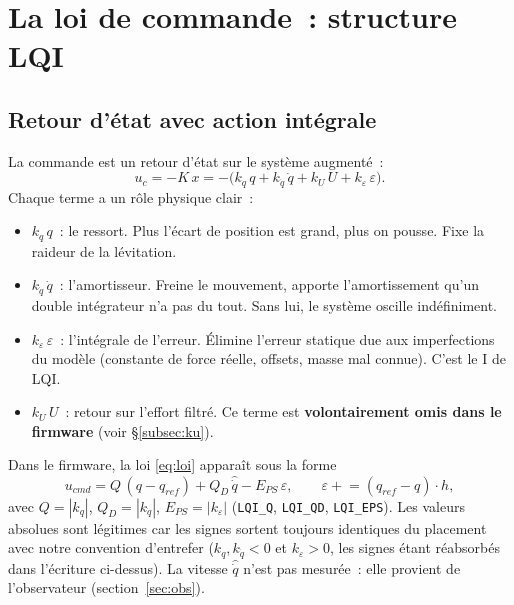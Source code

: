 \documentclass[a4paper,11pt]{article}
\newcommand{\qm}{q}
\begin{document}
\section{La loi de commande~: structure LQI}
\label{sec:lqi}

\subsection{Retour d'état avec action intégrale}

La commande est un retour d'état sur le système augmenté~:
\begin{equation}
    u_c = -K\,x = -\big(k_q\,\qm + k_{\dot q}\,\dot{\qm} + k_U\,U
          + k_\varepsilon\,\varepsilon\big).
    \label{eq:loi}
\end{equation}
Chaque terme a un rôle physique clair~:
\begin{itemize}
    \item $k_q\,\qm$~: le ressort. Plus l'écart de position est grand, plus on
          pousse. Fixe la raideur de la lévitation.
    \item $k_{\dot q}\,\dot{\qm}$~: l'amortisseur. Freine le mouvement, apporte
          l'amortissement qu'un double intégrateur n'a pas du tout. Sans lui,
          le système oscille indéfiniment.
    \item $k_\varepsilon\,\varepsilon$~: l'intégrale de l'erreur. Élimine
          l'erreur statique due aux imperfections du modèle (constante de
          force réelle, offsets, masse mal connue). C'est le \og I \fg{} de LQI.
    \item $k_U\,U$~: retour sur l'effort filtré. Ce terme est
          \textbf{volontairement omis dans le firmware} (voir
          §\ref{subsec:ku}).
\end{itemize}

Dans le firmware, la loi \eqref{eq:loi} apparaît sous la forme
\begin{equation}
    u_{cmd} = Q\,(\qm - \qm_{ref}) + Q_D\,\hat{\dot q} - E_{PS}\,\varepsilon,
    \qquad \varepsilon \mathrel{+}= (\qm_{ref} - \qm)\cdot h,
\end{equation}
avec $Q = |k_q|$, $Q_D = |k_{\dot q}|$, $E_{PS} = |k_\varepsilon|$
(\texttt{LQI\_Q}, \texttt{LQI\_QD}, \texttt{LQI\_EPS}). Les valeurs absolues
sont légitimes car les signes sortent toujours identiques du placement avec
notre convention d'entrefer ($k_q, k_{\dot q} < 0$ et $k_\varepsilon > 0$,
les signes étant réabsorbés dans l'écriture ci-dessus). La vitesse
$\hat{\dot q}$ n'est pas mesurée~: elle provient de l'observateur
(section~\ref{sec:obs}).
\end{document}
